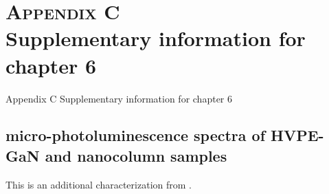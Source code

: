 
\chapter[Appendix C \hspace{0.0025em} Supplementary information for chapter 6]{\textsc{Appendix C} \vspace{8pt} \\ Supplementary information for chapter 6}

\label{appendix:C}

\setcounter{chapter}{0}
\renewcommand{\thechapter}{\Alph{chapter}}
\renewcommand{\theHchapter}{C\thechapter}

\setcounter{section}{0}
\renewcommand{\thesection}{C.\arabic{section}}

\setcounter{figure}{0}
\renewcommand{\thefigure}{C.\arabic{figure}}

\setcounter{table}{0}
\renewcommand{\thetable}{C.\arabic{table}}

\updatemylofappendixC

%
{Appendix C \hspace{0.0025em} Supplementary information for chapter 6}

\regularsection
\headerspecialsectionappendix


\section[micro-PL spectra]{micro-photoluminescence spectra of HVPE-GaN and nanocolumn samples}

This is an additional characterization from .

